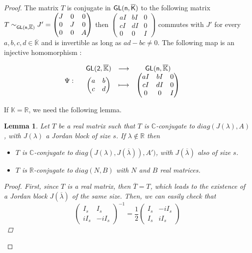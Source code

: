 \documentclass[a4paper,11pt]{article}
\newtheorem{lemma}{Lemma}[section]
\theoremstyle{definition}
\newcommand{\R}{\mathbb R}
\newcommand{\K}{\mathbb K}
\def \GL{\sf{GL}}
\begin{document}
\begin{proof}
The matrix $T$ is conjugate in $\GL(n,\overline{K})$ to the following matrix
    $T \sim_{\GL(n,\overline{\K})}
J'=\begin{pmatrix}
J & 0& 0 \\
0 & J & 0\\
0 & 0 & A 
\end{pmatrix} $
then 
$\begin{pmatrix}
aI & bI & 0 \\
cI & dI & 0\\
0 & 0 & I 
\end{pmatrix} $
commutes with $J'$ for every $a,b,c,d \in \overline{\K} $ and is invertible as long as $ad-bc\ne 0$.
The following map is an injective homomorphism : 

   \[ \Psi  :
\begin{array}{ccccc}
&  \GL(2,\overline{\K})  & \longrightarrow & \GL(n,\overline{\K}) & \\
& \begin{pmatrix}
a & b  \\
c & d 
\end{pmatrix}  & \longmapsto &
\begin{pmatrix}
aI & bI & 0 \\
cI & dI & 0 \\
0 & 0 & I
\end{pmatrix} \\
\end{array}
 \]



If $\K=\R$, we need the following lemma. 

\begin{lemma}\label{lemma5}
    Let $T$ be a real matrix such that $T$ is $\mathbb{C}$-conjugate to $diag(J(\lambda),A )$, with $J(\lambda)$ a Jordan block of size $s$. \newline
    If $\lambda \notin \R$ then
    \begin{itemize}
        \item $T$ is $\mathbb{C}$-conjugate to $diag(J(\lambda), J(\overline{\lambda})), A')$, with $J(\overline{\lambda})$ also of  size $s$.
        \item $T$ is $\R$-conjugate to $diag(N,B)$ with $N$ and $B$ real matrices.
    \end{itemize}
\begin{proof}
    First, since $T$ is a real matrix, then $\overline{T}=T$, which leads to the existence of a Jordan block $J(\overline{\lambda})$ of the same size.
    Then, we can easily check that 
$$\begin{pmatrix}
I_s & I_s \\
iI_s & -iI_s  
\end{pmatrix}^{-1}= \frac{1}{2}\begin{pmatrix}
I_s & -iI_s \\
I_s & iI_s  
\end{pmatrix}$$ 


\end{proof}
\end{lemma}
\end{proof}
\end{document}
